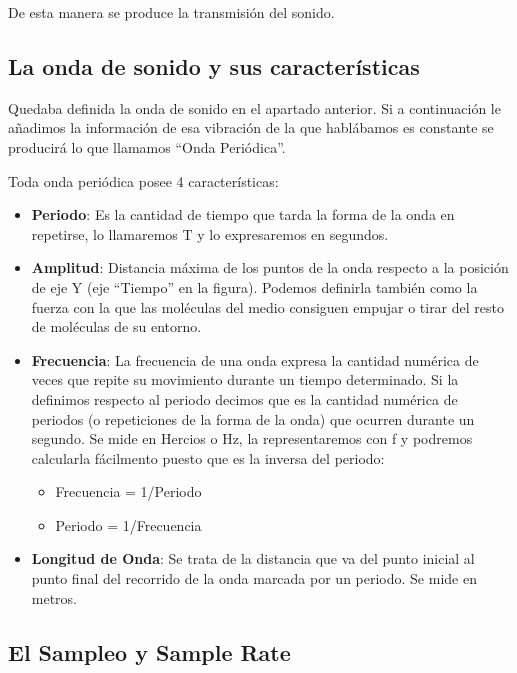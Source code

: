 De esta manera se produce la transmisión del sonido.

\subsection{La onda de sonido y sus características}\label{sec:Ondas} 

Quedaba definida la onda de sonido en el apartado anterior. Si a continuación le añadimos la información de esa vibración de la que hablábamos es constante se producirá lo que llamamos ``Onda Periódica''.

Toda onda periódica posee 4 características:

\begin{itemize}
	\item \textbf{Periodo}: Es la cantidad de tiempo que tarda la forma de la onda en repetirse, lo llamaremos T y lo expresaremos en segundos.
	 \item \textbf{Amplitud}: Distancia máxima de los puntos de la onda respecto a la posición de eje Y (eje ``Tiempo'' en la figura). Podemos definirla también como la fuerza con la que las moléculas del medio consiguen empujar o tirar del resto de moléculas de su entorno.
    \item \textbf{Frecuencia}: La frecuencia de una onda expresa la cantidad numérica de veces que repite su movimiento durante un tiempo determinado. Si la definimos respecto al periodo decimos que es la cantidad numérica de periodos (o repeticiones de la forma de la onda) que ocurren durante un segundo. Se mide en Hercios o Hz, la representaremos con f y podremos calcularla fácilmento puesto que es la inversa del periodo:
    \begin{itemize}
    \item Frecuencia = 1/Periodo
    \item Periodo = 1/Frecuencia   
    \end{itemize}
    \item \textbf{Longitud de Onda}: Se trata de la distancia que va del punto inicial al punto final del recorrido de la onda marcada por un periodo. Se mide en metros.
\end{itemize} 

\subsection{El Sampleo y Sample Rate}\label{sec:sr} 

